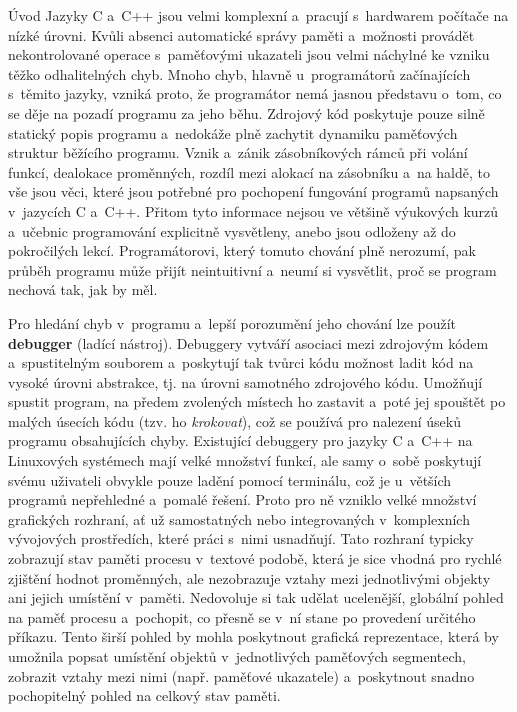 \documentclass[czech,bachelor,male,python,dept460,hidelinks]{diploma}						%
\newcommand{\parspace}[1][]{
	\ifthenelse{\isempty{#1}}{\vspace{0mm}}{\vspace{#1}}
	\par
}
\begin{document}
\MakeTitlePages

\begin{section}{Úvod}
	Jazyky C a~C++ jsou velmi komplexní a~pracují s~hardwarem počítače na nízké úrovni.
	Kvůli absenci automatické správy paměti a~možnosti provádět nekontrolované operace s~paměťovými ukazateli jsou velmi náchylné ke vzniku těžko odhalitelných chyb.
	Mnoho chyb, hlavně u~programátorů začínajících s~těmito jazyky, vzniká proto, že programátor nemá jasnou představu o~tom, co se děje na pozadí programu za
	jeho běhu. Zdrojový kód poskytuje pouze silně statický popis programu a~nedokáže plně zachytit dynamiku paměťových struktur běžícího programu.
	Vznik a~zánik zásobníkových rámců při volání funkcí, dealokace proměnných, rozdíl mezi alokací na zásobníku a~na haldě,
	to vše jsou věci, které jsou potřebné pro pochopení fungování programů napsaných v~jazycích C a~C++. Přitom tyto informace nejsou ve většině výukových kurzů
	a~učebnic programování explicitně vysvětleny, anebo jsou odloženy až do pokročilých lekcí. Programátorovi, který tomuto chování plně nerozumí,
	pak průběh programu může přijít neintuitivní a~neumí si vysvětlit, proč se program nechová tak, jak by měl.
	
	\parspace Pro hledání chyb v~programu a~lepší porozumění jeho chování lze použít \textbf{debugger} (ladící nástroj).
	Debuggery vytváří asociaci mezi zdrojovým kódem a~spustitelným souborem a~poskytují tak tvůrci kódu možnost ladit kód
	na vysoké úrovni abstrakce, tj. na úrovni samotného zdrojového kódu. Umožňují spustit program, na předem zvolených místech ho zastavit a~poté jej spouštět
	po malých úsecích kódu (tzv. ho \textit{krokovat}), což se používá pro nalezení úseků programu obsahujících chyby. Existující debuggery pro jazyky C a~C++ na
	Linuxových systémech mají velké množství funkcí, ale samy o~sobě poskytují svému uživateli obvykle pouze ladění pomocí terminálu, což je u~větších programů
	nepřehledné a~pomalé řešení. Proto pro ně vzniklo velké množství grafických rozhraní, ať už samostatných nebo integrovaných v~komplexních vývojových prostředích,
	které práci s~nimi usnadňují. Tato rozhraní typicky zobrazují stav paměti procesu v~textové podobě, která je sice vhodná pro rychlé
	zjištění hodnot proměnných, ale nezobrazuje vztahy mezi jednotlivými objekty ani jejich umístění v~paměti.
	Nedovoluje si tak udělat ucelenější, globální pohled na paměť procesu a~pochopit, co přesně se v~ní stane po provedení určitého příkazu.
	Tento širší pohled by mohla poskytnout grafická reprezentace, která by umožnila popsat umístění objektů v~jednotlivých paměťových segmentech,
	zobrazit vztahy mezi nimi (např. paměťové ukazatele) a~poskytnout snadno pochopitelný pohled na celkový stav paměti.
	

\end{section}
\end{document}
